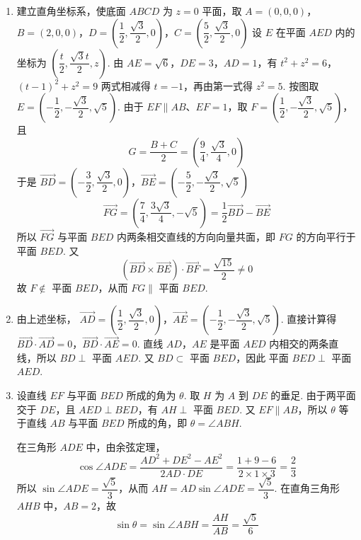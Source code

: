 \begin{solution}
\begin{enumerate}
\item 建立直角坐标系，使底面 \(ABCD\) 为 \(z=0\) 平面，取
\(A=(0,0,0)\)，\(B=(2,0,0)\)，\(D=\left(\dfrac12,\dfrac{\sqrt3}{2},0\right)\)，\(C=\left(\dfrac52,\dfrac{\sqrt3}{2},0\right)\)
设 \(E\) 在平面 \(AED\) 内的坐标为
\(\left(\dfrac t2,\dfrac{\sqrt3t}{2},z\right)\). 由
\(AE=\sqrt6\)，\(DE=3\)，\(AD=1\)，有
\(t^2+z^2=6\)，\((t-1)^2+z^2=9\)
两式相减得 \(t=-1\)，再由第一式得 \(z^2=5\). 按图取
\(E=\left(-\dfrac12,-\dfrac{\sqrt3}{2},\sqrt5\right)\). 由于
\(EF\parallel AB\)、\(EF=1\)，取
\(F=\left(\dfrac12,-\dfrac{\sqrt3}{2},\sqrt5\right)\)，且
\[
G=\dfrac{B+C}{2}
=\left(\dfrac94,\dfrac{\sqrt3}{4},0\right)
\]
于是
\(\overrightarrow{BD}=\left(-\dfrac32,\dfrac{\sqrt3}{2},0\right)\)，\(\overrightarrow{BE}=\left(-\dfrac52,-\dfrac{\sqrt3}{2},\sqrt5\right)\)
\[
\overrightarrow{FG}
=\left(\dfrac74,\dfrac{3\sqrt3}{4},-\sqrt5\right)
=\dfrac12\overrightarrow{BD}-\overrightarrow{BE}
\]
所以 \(\overrightarrow{FG}\) 与平面 \(BED\) 内两条相交直线的方向向量共面，即
\(FG\) 的方向平行于平面 \(BED\). 又
\[
\left(\overrightarrow{BD}\times\overrightarrow{BE}\right)
\cdot\overrightarrow{BF}=\dfrac{\sqrt{15}}{2}\ne0
\]
故 \(F\notin\) 平面 \(BED\)，从而 \(FG\parallel\) 平面 \(BED\).

\item 由上述坐标，
\(\overrightarrow{AD}=\left(\dfrac12,\dfrac{\sqrt3}{2},0\right)\)，\(\overrightarrow{AE}=\left(-\dfrac12,-\dfrac{\sqrt3}{2},\sqrt5\right)\).
直接计算得
\(\overrightarrow{BD}\cdot\overrightarrow{AD}=0\)，\(\overrightarrow{BD}\cdot\overrightarrow{AE}=0\).
直线 \(AD\)，\(AE\) 是平面 \(AED\) 内相交的两条直线，所以
\(BD\perp\) 平面 \(AED\). 又 \(BD\subset\) 平面 \(BED\)，因此
平面 \(BED\perp\) 平面 \(AED\).

\item 设直线 \(EF\) 与平面 \(BED\) 所成的角为 \(\theta\). 取
\(H\) 为 \(A\) 到 \(DE\) 的垂足. 由于两平面交于 \(DE\)，且
\(AED\perp BED\)，有 \(AH\perp\) 平面 \(BED\). 又 \(EF\parallel AB\)，所以
\(\theta\) 等于直线 \(AB\) 与平面 \(BED\) 所成的角，即
\(\theta=\angle ABH\).

在三角形 \(ADE\) 中，由余弦定理，
\[
\cos\angle ADE
=\dfrac{AD^2+DE^2-AE^2}{2AD\cdot DE}
=\dfrac{1+9-6}{2\times1\times3}
=\dfrac23
\]
所以 \(\sin\angle ADE=\dfrac{\sqrt5}{3}\)，从而
\(AH=AD\sin\angle ADE=\dfrac{\sqrt5}{3}\). 在直角三角形
\(AHB\) 中，\(AB=2\)，故
\[
\sin\theta=\sin\angle ABH=\dfrac{AH}{AB}
=\dfrac{\sqrt5}{6}
\]
\end{enumerate}
\end{solution}

